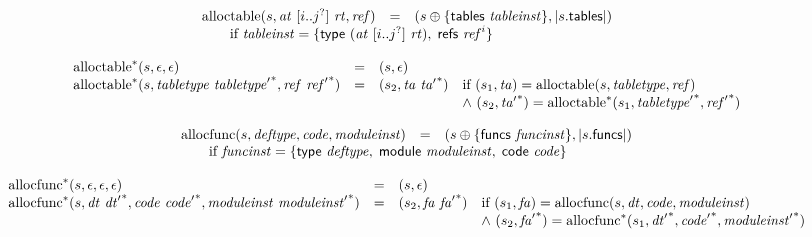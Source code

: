 $$
\begin{array}[t]{@{}lcl@{}l@{}}
{\mathrm{alloctable}}(s, {\mathit{at}}~{}[ i .. {j^?} ]~{\mathit{rt}}, {\mathit{ref}}) & = & (s \oplus \{ \mathsf{tables}~{\mathit{tableinst}} \}, {|s{.}\mathsf{tables}|}) &  \\
 \multicolumn{4}{@{}l@{}}{\quad
\quad \mbox{if}~ {\mathit{tableinst}} = \{ \mathsf{type}~({\mathit{at}}~{}[ i .. {j^?} ]~{\mathit{rt}}),\;\allowbreak \mathsf{refs}~{{\mathit{ref}}^{i}} \}
} \\
\end{array}
$$

$$
\begin{array}[t]{@{}lcl@{}l@{}}
{{{\mathrm{alloctable}}^\ast}}{(s, \epsilon, \epsilon)} & = & (s, \epsilon) \\
{{{\mathrm{alloctable}}^\ast}}{(s, {\mathit{tabletype}}~{{\mathit{tabletype}'}^\ast}, {\mathit{ref}}~{{\mathit{ref}'}^\ast})} & = & (s_2, {\mathit{ta}}~{{\mathit{ta}'}^\ast}) & \quad
\begin{array}[t]{@{}l@{}}
\mbox{if}~ (s_1, {\mathit{ta}}) = {\mathrm{alloctable}}(s, {\mathit{tabletype}}, {\mathit{ref}}) \\
{\land}~ (s_2, {{\mathit{ta}'}^\ast}) = {{{\mathrm{alloctable}}^\ast}}{(s_1, {{\mathit{tabletype}'}^\ast}, {{\mathit{ref}'}^\ast})} \\
\end{array} \\
\end{array}
$$

$$
\begin{array}[t]{@{}lcl@{}l@{}}
{\mathrm{allocfunc}}(s, {\mathit{deftype}}, {\mathit{code}}, {\mathit{moduleinst}}) & = & (s \oplus \{ \mathsf{funcs}~{\mathit{funcinst}} \}, {|s{.}\mathsf{funcs}|}) &  \\
 \multicolumn{4}{@{}l@{}}{\quad
\quad \mbox{if}~ {\mathit{funcinst}} = \{ \mathsf{type}~{\mathit{deftype}},\;\allowbreak \mathsf{module}~{\mathit{moduleinst}},\;\allowbreak \mathsf{code}~{\mathit{code}} \}
} \\
\end{array}
$$

$$
\begin{array}[t]{@{}lcl@{}l@{}}
{{{\mathrm{allocfunc}}^\ast}}{(s, \epsilon, \epsilon, \epsilon)} & = & (s, \epsilon) \\
{{{\mathrm{allocfunc}}^\ast}}{(s, {\mathit{dt}}~{{\mathit{dt}'}^\ast}, {\mathit{code}}~{{{\mathit{code}}'}^\ast}, {\mathit{moduleinst}}~{{\mathit{moduleinst}'}^\ast})} & = & (s_2, {\mathit{fa}}~{{\mathit{fa}'}^\ast}) & \quad
\begin{array}[t]{@{}l@{}}
\mbox{if}~ (s_1, {\mathit{fa}}) = {\mathrm{allocfunc}}(s, {\mathit{dt}}, {\mathit{code}}, {\mathit{moduleinst}}) \\
{\land}~ (s_2, {{\mathit{fa}'}^\ast}) = {{{\mathrm{allocfunc}}^\ast}}{(s_1, {{\mathit{dt}'}^\ast}, {{{\mathit{code}}'}^\ast}, {{\mathit{moduleinst}'}^\ast})} \\
\end{array} \\
\end{array}
$$

